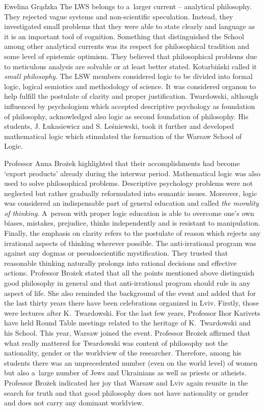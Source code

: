 \begin{editorialeng}{Ewelina Grądzka}
The LWS belongs to a~larger current – analytical philosophy. They rejected vague systems and non-scientific speculation. Instead, they investigated small problems that they were able to state clearly and language as it is an important tool of cognition. Something that distinguished the School among other analytical currents was its respect for philosophical tradition and some level of epistemic optimism. They believed that philosophical problems due to meticulous analysis are solvable or at least better stated. Kotarbiński called it \textit{small philosophy}. The LSW members considered logic to be divided into formal logic, logical semiotics and methodology of science. It was considered organon to help fulfill the postulate of clarity and proper justification. Twardowski, although influenced by psychologism which accepted descriptive psychology as foundation of philosophy, acknowledged also logic as second foundation of philosophy. His students, J. Łukasiewicz and S. Leśniewski, took it further and developed mathematical logic which stimulated the formation of the Warsaw School of Logic.

Professor Anna Brożek highlighted that their accomplishments had become ‘export products’ already during the interwar period. Mathematical logic was also used to solve philosophical problems. Descriptive psychology problems were not neglected but rather gradually reformulated into semantic issues. Moreover, logic was considered an indispensable part of general education and called \textit{the morality of thinking}. A~person with proper logic education is able to overcome one’s own biases, mistakes, prejudice, thinks independently and is resistant to manipulation. Finally, the emphasis on clarity refers to the postulate of reason which rejects any irrational aspects of thinking wherever possible. The anti-irrational program was against any dogmas or pseudoscientific mystification. They trusted that reasonable thinking naturally prolongs into rational decisions and effective actions. Professor Brożek stated that all the points mentioned above distinguish good philosophy in general and that anti-irrational program should rule in any aspect of life. She also reminded the background of the event and added that for the last thirty years there have been celebrations organized in Lviv. Firstly, those were lectures after K.~Twardowski. For the last few years, Professor Ihor Karivets have held Round Table meetings related to the heritage of K.~Twardowski and his School. This year, Warsaw joined the event. Professor Brożek affirmed that what really mattered for Twardowski was content of philosophy not the nationality, gender or the worldview of the researcher. Therefore, among his students there was an unprecedented number (even on the world level) of women but also a~large number of Jews and Ukrainians as well as priests or atheists. Professor Brożek indicated her joy that Warsaw and Lviv again reunite in the search for truth and that good philosophy does not have nationality or gender and does not carry any dominant worldview.


\end{editorialeng}
